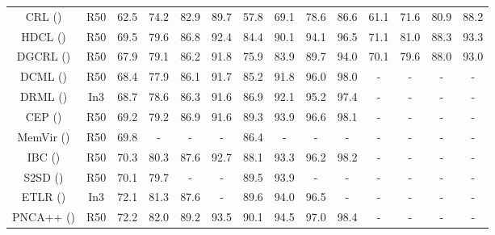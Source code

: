 \documentclass[letterpaper]{article} %
\begin{document}
\begin{table}
\begin{tabular}{c|c||cccc|cccc|cccc}
CRL (\citeauthor{DBLP:conf/ijcai/ZhengJSWHY18}) & R50& 62.5 & 74.2 & 82.9 &89.7& 57.8& 69.1&78.6&86.6& 61.1& 71.6&80.9&88.2\\
HDCL (\citeauthor{DBLP:journals/ijon/ZengLWZCL21}) & R50& 69.5 & 79.6 & 86.8 &92.4& 84.4& 90.1&94.1&96.5& 71.1& 81.0&88.3&93.3\\
\hline
\hline
		DGCRL (\citeauthor{DBLP:conf/aaai/ZhengJSZWH19})& R50& 67.9 & 79.1 & 86.2 &91.8& 75.9& 83.9&89.7&94.0& 70.1& 79.6&88.0&93.0\\
		DCML (\citeauthor{DBLP:conf/cvpr/ZhengWL021}) & R50& 68.4 & 77.9 & 86.1 &91.7& 85.2& 91.8&96.0&98.0&-& -& -&-\\
		DRML (\citeauthor{DBLP:conf/iccv/ZhengZL021}) & In3 & 68.7 & 78.6 & 86.3 & 91.6 & 86.9 & 92.1& 95.2& 97.4 & -& -& -&-\\
		CEP (\citeauthor{DBLP:conf/eccv/BoudiafRZGPPA20})& R50&69.2 & 79.2 & 86.9 &91.6& 89.3& 93.9&96.6&98.1&  -& -& -&-\\
		MemVir (\citeauthor{DBLP:conf/iccv/KoGK21}) & R50 & 69.8&-&-&-& 86.4&-&-&-&- &- &- &-\\
	    IBC (\citeauthor{DBLP:conf/icml/SeidenschwarzEL21}) & R50 & 70.3 & 80.3& 87.6& 92.7& 88.1& 93.3& 96.2& 98.2& - &- &- &- \\
		S2SD (\citeauthor{DBLP:conf/icml/RothMOCG21})& R50& 70.1 & 79.7& -&-&89.5& 93.9&-&-&- &- &- &-\\
		ETLR (\citeauthor{DBLP:conf/cvpr/KimKCK21})& In3& 72.1 & 81.3 & 87.6 &-& 89.6& 94.0&96.5&-&-& -& -&- \\
		PNCA++ (\citeauthor{DBLP:conf/eccv/TehDT20})& R50& 72.2 & 82.0 & 89.2 &93.5& 90.1& 94.5&97.0&98.4&-& -& -&-\\
\hline
\hline



\end{tabular}
\end{table}
\end{document}

